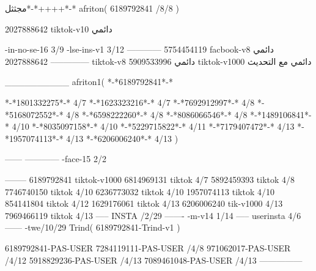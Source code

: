 مجثثل*-*++++*-*
afriton(
6189792841 /8/8
)

2027888642 tiktok-v10
دائمي

-in-no-se-16 3/9
-lse-ins-v1 3/12
------------
5754454119 facbook-v8
دائمي
--------------
2027888642 tiktok-v8
دائمي
5909533996 tiktok-v1000
دائمي مع التحديث

__________
afriton1(
*-*6189792841*-*

*-*1801332275*-* 4/7
*-*1623323216*-* 4/7
*-*7692912997*-* 4/8
*-*5168072552*-* 4/8
*-*6598222260*-* 4/8
*-*8086066546*-* 4/8
*-*1489106841*-* 4/10
*-*8035097158*-* 4/10
*-*5229715822*-* 4/11
*-*7179407472*-* 4/13
*-*1957074113*-* 4/13
*-*6206006240*-* 4/13
)


------
------------
-face-15 2/2

--------
6189792841 tiktok-v1000
6814969131 tiktok 4/7
5892459393 tiktok 4/8
7746740150 tiktok 4/10
6236773032 tiktok 4/10
1957074113 tiktok 4/10
854141804 tiktok 4/12
1629176061 tiktok 4/13
6206006240 tik-v1000 4/13
7969466119 tiktok 4/13
-----
 INSTA /2/29
-------
-m-v14 1/14
-----
userinsta 4/6
------
-twe/10/29
Trind(
6189792841-Trind-v1 
)

6189792841-PAS-USER
7284119111-PAS-USER /4/8
971062017-PAS-USER /4/12
5918829236-PAS-USER /4/13
7089461048-PAS-USER /4/13
    ---------------
